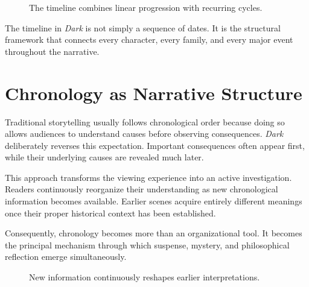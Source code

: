 \documentclass[12pt,oneside,openany]{book}
\begin{document}
\begin{figure}[H]
\centering
{}
\caption{The timeline combines linear progression with recurring cycles.}
\end{figure}

\begin{tcolorbox}[colback=gray!8,colframe=black,title=Key Observation]
The timeline in \textit{Dark} is not simply a sequence of dates. It is the
structural framework that connects every character, every family, and every
major event throughout the narrative.
\end{tcolorbox}

\section{Chronology as Narrative Structure}

Traditional storytelling usually follows chronological order because doing so
allows audiences to understand causes before observing consequences.
\textit{Dark} deliberately reverses this expectation. Important consequences
often appear first, while their underlying causes are revealed much later.

This approach transforms the viewing experience into an active investigation.
Readers continuously reorganize their understanding as new chronological
information becomes available. Earlier scenes acquire entirely different
meanings once their proper historical context has been established.

Consequently, chronology becomes more than an organizational tool. It becomes
the principal mechanism through which suspense, mystery, and philosophical
reflection emerge simultaneously.

\begin{figure}[H]
\centering
{}
\caption{New information continuously reshapes earlier interpretations.}
\end{figure}
\end{document}
